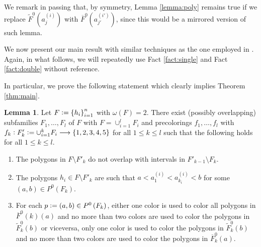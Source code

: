 \documentclass[12pt]{article}
\theoremstyle{definition}
\newtheorem{lemma}[thm]{Lemma}
\newcommand{\defeq}{\vcentcolon=}
\begin{document}
     We remark in passing that, by symmetry,
     Lemma \ref{lemma:poly} remains 
     true if we
     replace $\widetilde{F}^{0}\left(a_{j}^{\left(i\right)}\right)$ 
     with $\overline{F}^{0}\left(a_{j'}^{\left(i'\right)}\right)$,
     since this would be a mirrored version
     of such lemma.
      
     We now present our main result
     with similar techniques as the one
     employed in \cite{rus}.
     Again, in what follows, 
     we will repeatedly use
     Fact \ref{fact:single}
     and Fact \ref{fact:double}
     without reference.

     In particular, we prove the
     following  
     statement which clearly
     implies Theorem \ref{thm:main}.

     \begin{lemma}
         Let $F \defeq \left\{h_{i}\right\}_{i = 1}^{n}$ 
         with $\omega\left(F\right) = 2$.
         There exist (possibly overlapping)
         subfamilies
         $F_1, \ldots, F_{l}$ 
         of $F$ with $F = \cup_{i = 1}^{l} F_{i}$
         and precolorings
         $f_1, \ldots, f_{l}$ with
         $f_{k} \vcentcolon F'_{k} \defeq
         \cup_{i=1}^{k} F_{i} \longrightarrow
         \left\{1, 2, 3, 4, 5\right\}$
         for all $1 \leq k \leq l$
         such that the following holds
         for all $1 \leq k \leq l$.
         \begin{enumerate}
             \item \label{cond:1} The polygons
                 in $F \setminus F'_{k}$
                 do not overlap with 
                 intervals in 
                 $F'_{k-1} \setminus F_{k}$.
             \item \label{cond:2} The polygons
                 $h_{i} \in F \setminus  F'_{k}$ 
                 are such that 
                 $a < a_1^{\left(i\right)} <
                 a_{k_{i}}^{\left(i\right)} < b$
                 for some $\left(a, b\right)
                 \in P^{0}\left(F_{k}\right)$.
             \item \label{cond:3} For each
                 $p \defeq \left(a, b\right)
                 \in P^{0}\left(F_{k}\right)$,
                 either one color is used to
                 color all polygons in
                 $\overline{F}^{0}\left(k\right)
                 \left(a\right)$ and
                 no more than two colors
                 are used to color the polygons
                 in $\widetilde{F}^{0}_{k}\left(b\right)$
                 or viceversa,
                 only one color is used
                 to color the polygons
                 in $\widetilde{F}^{0}_{k}\left(b\right)$
                 and no more than
                 two colors are used to
                 color the polygons
                 in $\overline{F}^{0}_{k}\left(a\right)$. 
         \end{enumerate}
     \end{lemma}
\end{document}
